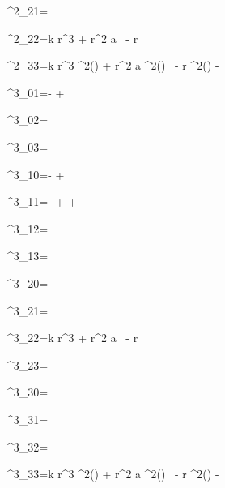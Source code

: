 \Gamma^{2}_{21}=


\Gamma^{2}_{22}=k r^{3} + r^{2} a \, - r


\Gamma^{2}_{33}=k r^{3} \sin^{2}{\left(\theta \right)} + r^{2} a \sin^{2}{\left(\theta \right)} \, - r \sin^{2}{\left(\theta \right)} - \sin{\left(\theta \right)} \cos{\left(\theta \right)}


\Gamma^{3}_{01}=-  + 


\Gamma^{3}_{02}=


\Gamma^{3}_{03}=


\Gamma^{3}_{10}=-  + 


\Gamma^{3}_{11}=-  +  + 


\Gamma^{3}_{12}=


\Gamma^{3}_{13}=


\Gamma^{3}_{20}=


\Gamma^{3}_{21}=


\Gamma^{3}_{22}=k r^{3} + r^{2} a \, - r


\Gamma^{3}_{23}=\dfrac{\cos{\left(\theta \right)}}{\sin{\left(\theta \right)}}


\Gamma^{3}_{30}=


\Gamma^{3}_{31}=


\Gamma^{3}_{32}=\dfrac{\cos{\left(\theta \right)}}{\sin{\left(\theta \right)}}


\Gamma^{3}_{33}=k r^{3} \sin^{2}{\left(\theta \right)} + r^{2} a \sin^{2}{\left(\theta \right)} \, - r \sin^{2}{\left(\theta \right)} - \sin{\left(\theta \right)} \cos{\left(\theta \right)}


